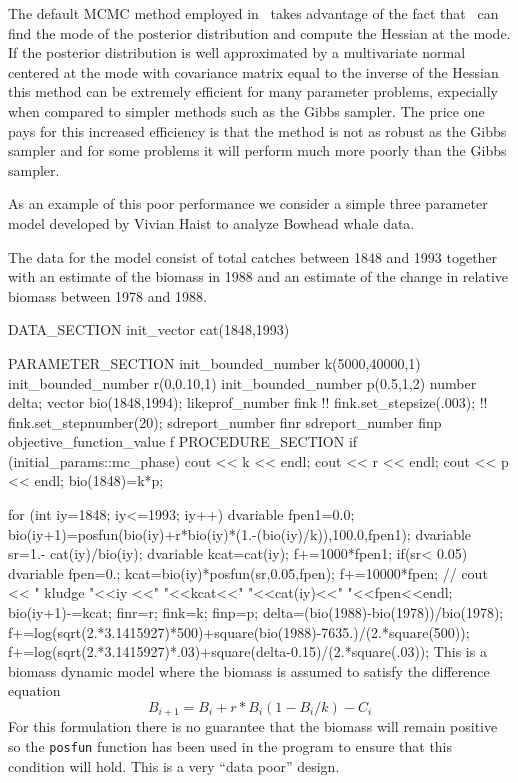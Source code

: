 \documentclass[12pt]{book}
\begin{document}
The default MCMC method employed in \ADM\ takes advantage of the
fact that \ADM\ can find the mode of the posterior distribution and
compute the Hessian at the mode. If the posterior distribution is well
approximated by a multivariate normal centered at the mode
with covariance matrix equal to the inverse of the Hessian 
this method can be extremely efficient for many parameter problems,
expecially when compared to simpler methods such as the Gibbs sampler.
The price one pays for this increased efficiency is that the method
is not as robust as the Gibbs sampler and for some problems it
will perform much more poorly than the Gibbs sampler.

As an example of this poor performance we consider a simple three
parameter model developed by Vivian Haist to analyze Bowhead whale
data.

The data for the model consist of total catches between 1848 and 1993
together with an estimate of the biomass in 1988 and an estimate of the
change in relative biomass between 1978 and 1988.
 
\beginexample
DATA_SECTION
  init_vector cat(1848,1993)

PARAMETER_SECTION
  init_bounded_number k(5000,40000,1)
  init_bounded_number r(0,0.10,1)
  init_bounded_number p(0.5,1,2)
  number delta;
  vector bio(1848,1994);
  likeprof_number fink
 !! fink.set_stepsize(.003);
 !! fink.set_stepnumber(20);
  sdreport_number finr
  sdreport_number finp
  objective_function_value f
PROCEDURE_SECTION
  if (initial_params::mc_phase)
  {
    cout << k << endl;
    cout << r << endl;
    cout << p << endl;
  }
  bio(1848)=k*p;
 
  for (int iy=1848; iy<=1993; iy++)
  {
     dvariable fpen1=0.0;
     bio(iy+1)=posfun(bio(iy)+r*bio(iy)*(1.-(bio(iy)/k)),100.0,fpen1); 
     dvariable sr=1.- cat(iy)/bio(iy);
     dvariable kcat=cat(iy);
      f+=1000*fpen1;
     if(sr< 0.05)
     {
       dvariable fpen=0.;
       kcat=bio(iy)*posfun(sr,0.05,fpen);
       f+=10000*fpen;
//     cout << " kludge "<<iy <<" "<<kcat<<" "<<cat(iy)<<" "<<fpen<<endl;
     }
     bio(iy+1)-=kcat;
  }
  finr=r;
  fink=k;
  finp=p;
  delta=(bio(1988)-bio(1978))/bio(1978);
  f+=log(sqrt(2.*3.1415927)*500)+square(bio(1988)-7635.)/(2.*square(500));
  f+=log(sqrt(2.*3.1415927)*.03)+square(delta-0.15)/(2.*square(.03));
\endexample
This is a biomass dynamic model where the biomass is assumed to
satisfy the difference equation
\begin{equation}
B_{i+1}=B_i+r*B_i(1-B_i/k)-C_i 
\end{equation}
For this formulation there is no guarantee that the biomass will
remain positive so the {\tt posfun} function has been used in 
the program to ensure that this condition will hold.
This is a very ``data poor'' design. 
\end{document}
